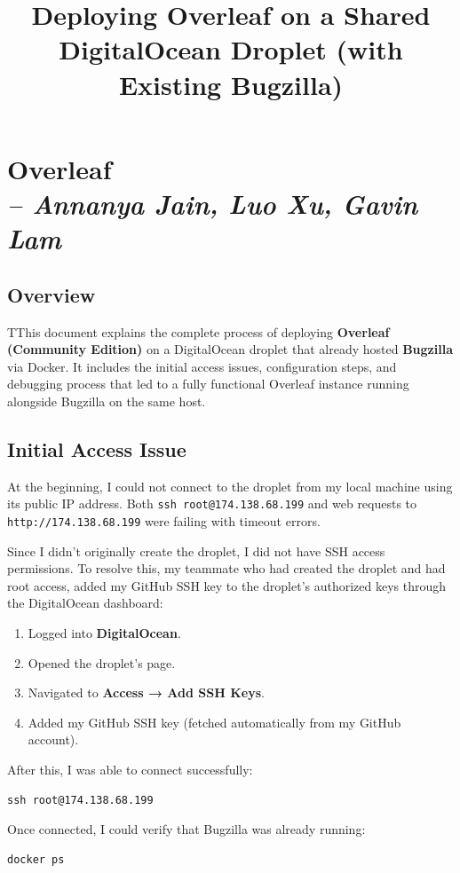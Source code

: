 \chapter{Overleaf \\
\small{\textit{-- Annanya Jain, Luo Xu, Gavin Lam}
\label{Chapter::Overleaf}}}

\title{Deploying Overleaf on a Shared DigitalOcean Droplet (with Existing Bugzilla)}
\section{Overview}
TThis document explains the complete process of deploying \textbf{Overleaf (Community Edition)} on a DigitalOcean droplet that already hosted \textbf{Bugzilla} via Docker.  
It includes the initial access issues, configuration steps, and debugging process that led to a fully functional Overleaf instance running alongside Bugzilla on the same host.

\section{Initial Access Issue}
At the beginning, I could not connect to the droplet from my local machine using its public IP address.  
Both \texttt{ssh root@174.138.68.199} and web requests to \texttt{http://174.138.68.199} were failing with timeout errors.

Since I didn’t originally create the droplet, I did not have SSH access permissions. To resolve this, my teammate who had created the droplet and had root access, added my GitHub SSH key to the droplet’s authorized keys through the DigitalOcean dashboard:

\begin{enumerate}
  \item Logged into \textbf{DigitalOcean}.
  \item Opened the droplet’s page.
  \item Navigated to \textbf{Access → Add SSH Keys}.
  \item Added my GitHub SSH key (fetched automatically from my GitHub account).
\end{enumerate}

After this, I was able to connect successfully:
\begin{verbatim}
ssh root@174.138.68.199
\end{verbatim}

Once connected, I could verify that Bugzilla was already running:
\begin{verbatim}
docker ps
\end{verbatim}


